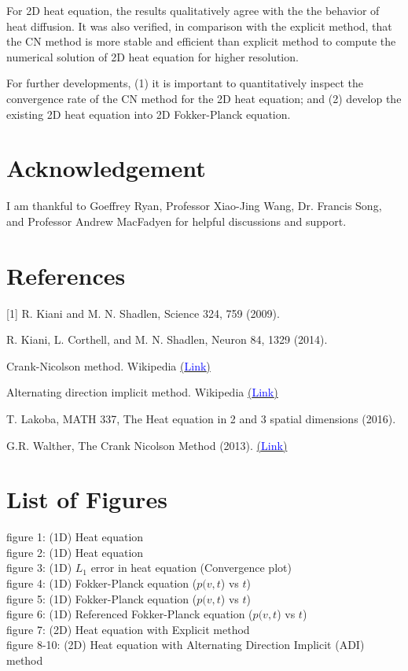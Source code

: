 \documentclass[12pt]{article}		%
\begin{document}
For 2D heat equation, the results qualitatively agree with the the behavior of heat diffusion. It was also verified, in comparison with the explicit method, that the CN method is more stable and efficient than explicit method to compute the numerical solution of 2D heat equation for higher resolution.

For further developments, (1) it is important to quantitatively inspect the convergence rate of the CN method for the 2D heat equation; and (2) develop the existing 2D heat equation into 2D Fokker-Planck equation.

\section*{Acknowledgement}
I am thankful to Goeffrey Ryan, Professor Xiao-Jing Wang, Dr. Francis Song, and Professor Andrew MacFadyen for helpful discussions and support.

\section*{References}
[1] R. Kiani and M. N. Shadlen, Science 324, 759 (2009). \par
[2] R. Kiani, L. Corthell, and M. N. Shadlen, Neuron 84, 1329 (2014). \par
[3] Crank-Nicolson method. Wikipedia \href{https://en.wikipedia.org/wiki/Crank-Nicolson_method}{(\textcolor{blue}{Link})} \par
[4] Alternating direction implicit method. Wikipedia \href{https://en.wikipedia.org/wiki/Alternating_direction_implicit_method}{(\textcolor{blue}{Link})} \par
[5] T. Lakoba, MATH 337, The Heat equation in 2 and 3 spatial dimensions (2016). \par
[6] G.R. Walther, The Crank Nicolson Method (2013). \href{http://georg.io/2013/12/Crank_Nicolson/} {(\textcolor{blue}{Link})}

\section*{List of Figures}
figure 1: (1D) Heat equation \\
figure 2: (1D) Heat equation \\
figure 3: (1D) $L_1$ error in heat equation (Convergence plot)\\
figure 4: (1D) Fokker-Planck equation ($p(v,t$) vs $t$) \\
figure 5: (1D) Fokker-Planck equation ($p(v,t$) vs $t$) \\
figure 6: (1D) Referenced Fokker-Planck equation ($p(v,t$) vs $t$) \\
figure 7: (2D) Heat equation with Explicit method\\
figure 8-10: (2D) Heat equation with Alternating Direction Implicit (ADI) method\\
\end{document}
